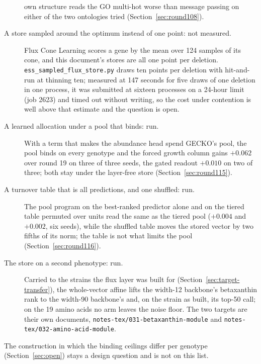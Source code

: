 \begin{description}
    own structure reads the GO multi-hot worse than message passing on either of the two
    ontologies tried (Section~\ref{sec:round108}).
  \item[A store sampled around the optimum instead of one point: not measured.] Flux
    Cone Learning scores a gene by the mean over 124 samples of its cone, and this
    document's stores are all one point per deletion. \texttt{ess\_sampled\_flux\_store.py}
    draws ten points per deletion with hit-and-run at thinning ten; measured at 147
    seconds for five draws of one deletion in one process, it was submitted at sixteen
    processes on a 24-hour limit (job 2623) and timed out without writing, so the cost
    under contention is well above that estimate and the question is open.
  \item[A learned allocation under a pool that binds: run.] With a term that makes
    the abundance head spend GECKO's pool, the pool binds on every genotype and the
    forced growth column gains $+0.062$ over round 19 on three of three seeds, the gated
    readout $+0.010$ on two of three; both stay under the layer-free store
    (Section~\ref{sec:round115}).
  \item[A turnover table that is all predictions, and one shuffled: run.] The pool
    program on the best-ranked predictor alone and on the tiered table permuted over
    units read the same as the tiered pool ($+0.004$ and $+0.002$, six seeds), while the
    shuffled table moves the stored vector by two fifths of its norm; the table is not
    what limits the pool (Section~\ref{sec:round116}).
  \item[The store on a second phenotype: run.] Carried to the strains the flux layer
    was built for (Section~\ref{sec:target-transfer}), the whole-vector affine lifts the
    width-12 backbone's betaxanthin rank to the width-90 backbone's and, on the strain as
    built, its top-50 call; on the 19 amino acids no arm leaves the noise floor. The two
    targets are their own documents, \texttt{notes-tex/031-betaxanthin-module} and
    \texttt{notes-tex/032-amino-acid-module}.
\end{description}

The construction in which the binding ceilings differ per genotype
(Section~\ref{sec:open}) stays a design question and is not on this list.
